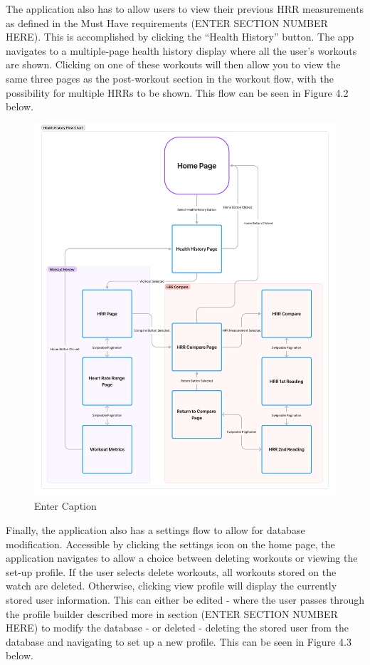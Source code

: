 \documentclass{l4proj}
\begin{document}
The application also has to allow users to view their previous HRR measurements as defined in the Must Have requirements (ENTER SECTION NUMBER HERE). This is accomplished by clicking the “Health History” button. The app navigates to a multiple-page health history display where all the user’s workouts are shown. Clicking on one of these workouts will then allow you to view the same three pages as the post-workout section in the workout flow, with the possibility for multiple HRRs to be shown. This flow can be seen in Figure 4.2 below.

\begin{figure}[h!]
    \centering
    \includegraphics[width=0.75\linewidth]{dissertation//dissImages/HealthHistoryFlow.pdf}
    \caption{Enter Caption}
    \label{fig:enter-label}
\end{figure}

Finally, the application also has a settings flow to allow for database modification. Accessible by clicking the settings icon on the home page, the application navigates to allow a choice between deleting workouts or viewing the set-up profile. If the user selects delete workouts, all workouts stored on the watch are deleted. Otherwise, clicking view profile will display the currently stored user information. This can either be edited - where the user passes through the profile builder described more in section (ENTER SECTION NUMBER HERE) to modify the database - or deleted - deleting the stored user from the database and navigating to set up a new profile. This can be seen in Figure 4.3 below.
\end{document}
